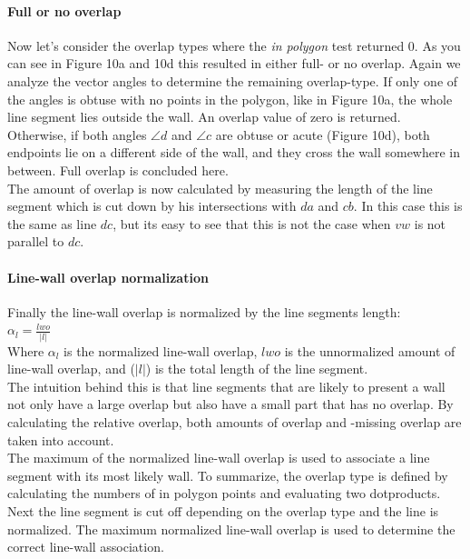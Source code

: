 \documentclass[10pt]{article}
\begin{document}
{	\paragraph{Full or no overlap}
	Now let's consider the overlap types where the \emph{in polygon} test
	returned 0.
	As you can see in Figure 10a and 10d this resulted in either full- or no overlap.
	Again we analyze the vector angles to determine the remaining overlap-type.
	If only one of the angles is obtuse with no points in the polygon, like in Figure 10a,
	the whole line segment lies outside the wall. An overlap value of zero
	is returned.\\
	Otherwise, if both angles $\angle d$ and $\angle c$ are obtuse or acute (Figure 10d),
	both endpoints lie on a different side of the wall, and they cross the wall somewhere in
	between. Full overlap is concluded here. \\
	The amount of overlap is now calculated by measuring the length
	of the line segment which is cut down by his intersections with $da$ and
	$cb$. In this case this is the same as line $dc$, but its easy to see that
	this is not the case when $vw$ is not parallel to $dc$.\\
	
	\paragraph{Line-wall overlap normalization}
	Finally the line-wall overlap is normalized by the line segments length:\\
	$\alpha_l = \frac{lwo}{|l|}$\\
	Where $\alpha_l$ is the normalized line-wall overlap, $lwo$ is the unnormalized
	amount of line-wall overlap, and ($|l|$) is the total length of the line
	segment.\\
	The intuition behind this is that line segments that are likely to
	present a wall not only have a large overlap but also have a small part
	that has no overlap. By calculating the relative overlap, both amounts of overlap
	and -missing overlap are taken into account.\\
	The maximum of the normalized line-wall overlap is used to associate a
	line segment with its most likely wall.
	To summarize, the overlap type is defined by calculating the numbers of in
	polygon points and evaluating two dotproducts. Next the line segment is cut off
	depending on the overlap type and the line is normalized. The maximum
	normalized line-wall overlap is used to determine the correct line-wall
	association.\\

}
\end{document}
